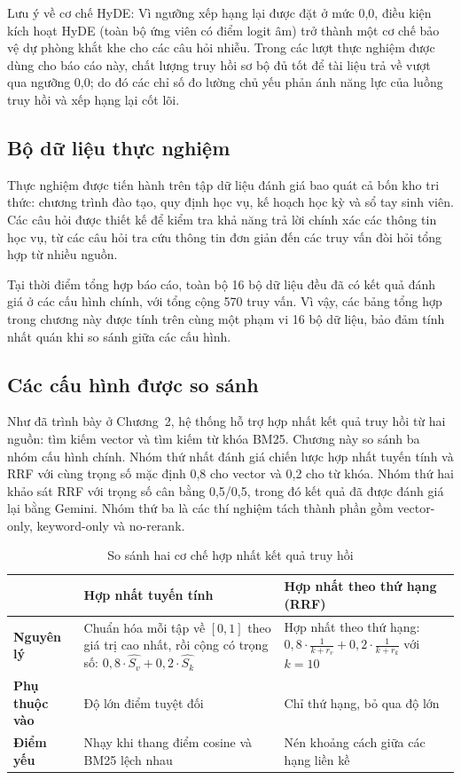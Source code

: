 \documentclass[../DoAn.tex]{subfiles}
\begin{document}
Lưu ý về cơ chế HyDE: Vì ngưỡng xếp hạng lại được đặt ở mức 0,0, điều kiện
kích hoạt HyDE (toàn bộ ứng viên có điểm logit âm) trở thành một cơ chế bảo vệ
dự phòng khắt khe cho các câu hỏi nhiễu. Trong các lượt thực nghiệm được dùng
cho báo cáo này, chất lượng truy hồi sơ bộ đủ tốt để tài liệu trả về vượt qua
ngưỡng 0,0; do đó các chỉ số đo lường chủ yếu phản ánh năng lực của luồng truy
hồi và xếp hạng lại cốt lõi.

\subsection{Bộ dữ liệu thực nghiệm}

Thực nghiệm được tiến hành trên tập dữ liệu đánh giá bao quát cả bốn kho tri
thức: chương trình đào tạo, quy định học vụ, kế hoạch học kỳ và sổ tay sinh
viên. Các câu hỏi được thiết kế để kiểm tra khả năng trả lời chính xác các
thông tin học vụ, từ các câu hỏi tra cứu thông tin đơn giản đến các truy vấn
đòi hỏi tổng hợp từ nhiều nguồn.

Tại thời điểm tổng hợp báo cáo, toàn bộ 16 bộ dữ liệu đều đã có kết quả đánh
giá ở các cấu hình chính, với tổng cộng 570 truy vấn. Vì vậy, các bảng tổng
hợp trong chương này được tính trên cùng một phạm vi 16 bộ dữ liệu, bảo đảm
tính nhất quán khi so sánh giữa các cấu hình.

\subsection{Các cấu hình được so sánh}

Như đã trình bày ở Chương~2, hệ thống hỗ trợ hợp nhất kết quả truy hồi từ hai
nguồn: tìm kiếm vector và tìm kiếm từ khóa BM25. Chương này so sánh ba nhóm
cấu hình chính. Nhóm thứ nhất đánh giá chiến lược hợp nhất tuyến tính và RRF
với cùng trọng số mặc định 0,8 cho vector và 0,2 cho từ khóa. Nhóm thứ hai khảo
sát RRF với trọng số cân bằng 0,5/0,5, trong đó kết quả đã được đánh giá lại
bằng Gemini. Nhóm thứ ba là các thí nghiệm tách thành phần gồm vector-only,
keyword-only và no-rerank.

\begin{table}[H]
\centering
\small
\begin{tabular}{|p{2.4cm}|p{5.6cm}|p{5.6cm}|}
\hline
& \textbf{Hợp nhất tuyến tính} & \textbf{Hợp nhất theo thứ hạng (RRF)} \\
\hline
\textbf{Nguyên lý} & Chuẩn hóa mỗi tập về $[0,1]$ theo giá trị cao nhất, rồi
cộng có trọng số: $0{,}8 \cdot \widehat{S_v} + 0{,}2 \cdot \widehat{S_k}$ &
Hợp nhất theo thứ hạng: $0{,}8 \cdot \frac{1}{k + r_v} + 0{,}2 \cdot
\frac{1}{k + r_k}$ với $k = 10$ \\
\hline
\textbf{Phụ thuộc vào} & Độ lớn điểm tuyệt đối & Chỉ thứ hạng, bỏ qua độ lớn \\
\hline
\textbf{Điểm yếu} & Nhạy khi thang điểm cosine và BM25 lệch nhau & Nén khoảng
cách giữa các hạng liền kề \\
\hline
\end{tabular}
\caption{So sánh hai cơ chế hợp nhất kết quả truy hồi}
\label{tab:ch6-fusion}
\end{table}
\end{document}
